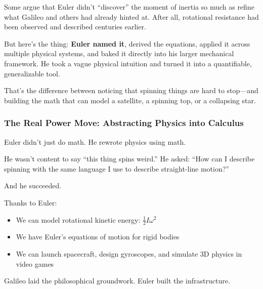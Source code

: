 Some argue that Euler didn’t “discover” the moment of inertia so much as refine what Galileo and others had already hinted at. After all, rotational resistance had been observed and described centuries earlier.

But here’s the thing: \textbf{Euler named it}, derived the equations, applied it across multiple physical systems, and baked it directly into his larger mechanical framework. He took a vague physical intuition and turned it into a quantifiable, generalizable tool.

That’s the difference between noticing that spinning things are hard to stop—and building the math that can model a satellite, a spinning top, or a collapsing star.

\subsubsection{The Real Power Move: Abstracting Physics into Calculus}

Euler didn’t just do math. He rewrote physics using math.

He wasn’t content to say “this thing spins weird.” He asked: “How can I describe spinning with the same language I use to describe straight-line motion?”

And he succeeded.

Thanks to Euler:
\begin{itemize}
    \item We can model rotational kinetic energy: \( \frac{1}{2} I \omega^2 \)
    \item We have Euler’s equations of motion for rigid bodies
    \item We can launch spacecraft, design gyroscopes, and simulate 3D physics in video games
\end{itemize}

Galileo laid the philosophical groundwork. Euler built the infrastructure.

\begin{center}
\end{center}

